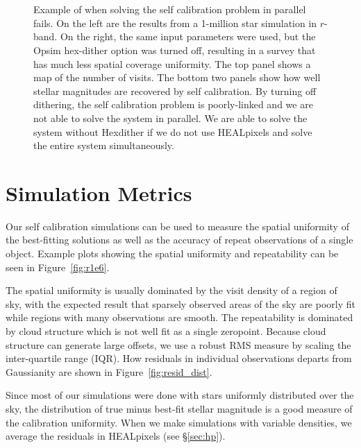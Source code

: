 \documentclass[12pt,preprint]{aastex}
\begin{document}
\begin{figure}
\\
\\
\caption{Example of when solving the self calibration problem in parallel fails.  On the left are the results from a 1-million star simulation in $r$-band.  On the right, the same input parameters were used, but the Opsim hex-dither option was turned off, resulting in a survey that has much less spatial coverage uniformity.  The top panel shows a map of the number of visits.  The bottom two panels show how well stellar magnitudes are recovered by self calibration.  By turning off dithering, the self calibration problem is poorly-linked and we are not able to solve the system in parallel.  We are able to solve the system without Hexdither if we do not use HEALpixels and solve the entire system simultaneously.  \label{fig:nodither}}
\end{figure}




\section{Simulation Metrics}

Our self calibration simulations can be used to measure the spatial uniformity of the best-fitting solutions as well as the accuracy of repeat observations of a single object.  Example plots showing the spatial uniformity and repeatability can be seen in Figure~\ref{fig:r1e6}.  

The spatial uniformity is usually dominated by the visit density of a region of sky, with the expected result that sparsely observed areas of the sky are poorly fit while regions with many observations are smooth.  The repeatability is dominated by cloud structure which is not well fit as a single zeropoint.  Because cloud structure can generate large offsets, we use a robust RMS measure by scaling the inter-quartile range (IQR).  How residuals in individual observations departs from Gaussianity are shown in Figure~\ref{fig:resid_dist}.

Since most of our simulations were done with stars uniformly distributed over the sky, the distribution of true minus best-fit stellar magnitude is a good measure of the calibration uniformity.  When we make simulations with variable densities, we average the residuals in HEALpixels (see \S\ref{sec:hp}).
\end{document}
